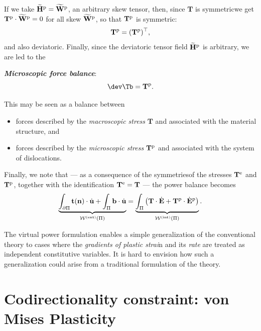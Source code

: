 If we take \( \widetilde{\mathbf{H}}^{\rm p} = \widetilde{\mathbf{W}}^{\rm p} \), an arbitrary skew tensor, then, since \( \mathbf{T} \) is symmetricwe get  \( \mathbf{T}^{\rm p} \cdot \widetilde{\mathbf{W}}^{\rm p} = 0 \) for all skew \( \widetilde{\mathbf{W}}^{\rm p} \), so that \( \mathbf{T}^{\rm p} \) is symmetric:
\[
\mathbf{T}^{\rm p} = (\mathbf{T}^{\rm p})^\top, 
\]
and  also deviatoric. Finally, since the deviatoric tensor field \( \widetilde{\mathbf{H}}^{\rm p} \)  is arbitrary, we are led to the 
\begin{definition}
\textbf{\textit{Microscopic force balance}}:
\begin{equation}\label{micrbal}
	\dev \Tb = \mathbf{T}^{\rm p}. 
\end{equation}
\end{definition}
This may be seen as a balance between
\begin{itemize}
	\item forces described by the \textit{macroscopic stress} \( \mathbf{T} \) and associated with the material structure, and
	\item forces described by the\textit{ microscopic stress} \( \mathbf{T}^{\rm p} \) and associated with the system of dislocations.
\end{itemize}

Finally, we note that — as a consequence of the symmetriesof the stresses \( \mathbf{T}^{\rm e} \) and \( \mathbf{T}^{\rm p} \), together with the identification \( \mathbf{T}^{\rm e} = \mathbf{T} \) — the power balance becomes
\[
\underbrace{\int_{\partial \Pi} \mathbf{t}(\mathbf{n}) \cdot \dot{\mathbf{u}} + \int_\Pi \mathbf{b} \cdot \dot{\mathbf{u}}}_{\mathcal{W}^{\rm (ext)}(\Pi)}
=
\underbrace{\int_\Pi \left( \mathbf{T} \cdot \dot{\mathbf{E}} + \mathbf{T}^{\rm p} \cdot \dot{\mathbf{E}}^{\rm p} \right)}_{\mathcal{W}^{\rm (int)}(\Pi)}. 
\]


\begin{remark}
The virtual power formulation enables a simple generalization of the conventional theory to cases where the\textit{ gradients of plastic strai}n and its \textit{rate} are treated as independent constitutive variables. It is hard to envision how such a generalization could arise from a traditional formulation of the theory.
\end{remark}




\section{ Codirectionality constraint: von Mises Plasticity}

